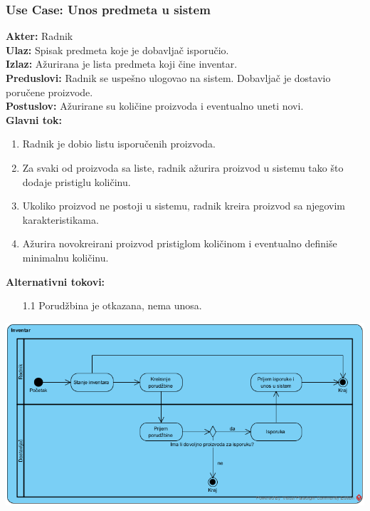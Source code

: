 \documentclass{article}
\begin{document}
\subsubsection{\textbf{Use Case}: Unos predmeta u sistem}
\textbf{Akter:} Radnik\\
\textbf{Ulaz:} Spisak predmeta koje je dobavljač isporučio.\\
\textbf{Izlaz:} Ažurirana je lista predmeta koji čine inventar.\\
\textbf{Preduslovi:} Radnik se uspešno ulogovao na sistem. Dobavljač je dostavio poručene proizvode.\\
\textbf{Postuslov:} Ažurirane su količine proizvoda i eventualno uneti novi.\\
\textbf{Glavni tok:} 

\begin{enumerate}
	\item Radnik je dobio listu isporučenih proizvoda.
	\item Za svaki od proizvoda sa liste, radnik ažurira proizvod u sistemu tako što dodaje pristiglu količinu.
	\item Ukoliko proizvod ne postoji u sistemu, radnik kreira proizvod sa njegovim karakteristikama.
	\item Ažurira novokreirani proizvod pristiglom količinom i eventualno definiše minimalnu količinu. 
\end{enumerate}
\textbf{Alternativni tokovi:} 
\begin{itemize}
\item [1.1] Porudžbina je otkazana, nema unosa.
\end{itemize}

\includegraphics[width=\textwidth]{SU_2_pregled_inventara_activity.png}

\end{document}
